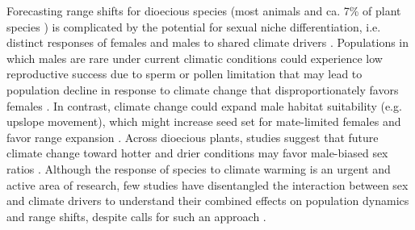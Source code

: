 \documentclass[9pt,twocolumn,twoside,lineno]{pnas-new}
\newcommand{\jacob}[2]{{\color{blue}{#1}}\footnote{\textit{\color{blue}{#2}}}}
\begin{document}
Forecasting range shifts for dioecious species (most animals and  ca. 7\% of plant species \citep{heilbuth2000lower}) is complicated by the potential for sexual niche differentiation, i.e. distinct responses of females and males to shared climate drivers \citep{hultine2016climate,morrison2016causes}. 
Populations in which males are rare under current climatic conditions could experience low reproductive success due to sperm or pollen limitation that may lead to population decline in response to climate change that disproportionately favors females \citep{eberhart2017sex}.
In contrast, climate change could expand male habitat suitability (e.g. upslope movement), which might increase seed set for mate-limited females and favor range expansion \citep{petry2016sex}. 
Across dioecious plants, studies suggest that future climate change toward hotter and drier conditions may favor male-biased sex ratios \citep{field2013comparative,hultine2016climate}. 
Although the response of species to climate warming is an urgent and active area of research, few studies have disentangled the interaction between sex and climate drivers to understand their combined effects on population dynamics and range shifts, despite calls for such an approach \citep{hultine2016climate,gissi2023exploring}.
\end{document}
